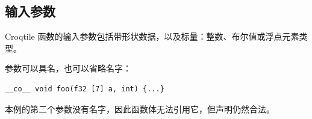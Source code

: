 \subsection*{输入参数}

Croqtile 函数的输入参数包括带形状数据，以及标量：整数、布尔值或浮点元素类型。

参数可以具名，也可以省略名字：

\begin{lstlisting}[language=croqtile,caption={输入参数}]
__co__ void foo(f32 [7] a, int) {...}
\end{lstlisting}

本例的第二个参数没有名字，因此函数体无法引用它，但声明仍然合法。
